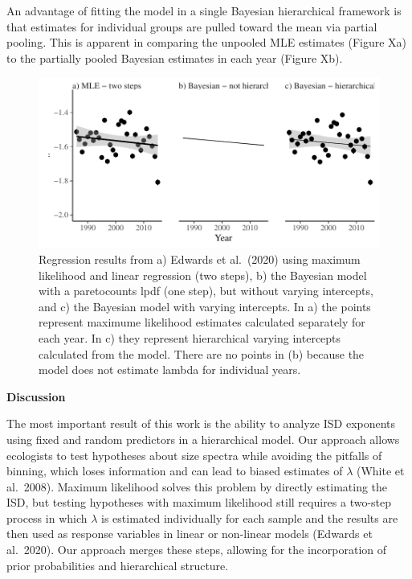\documentclass[
  12pt,
]{article}
\begin{document}
An advantage of fitting the model in a single Bayesian hierarchical
framework is that estimates for individual groups are pulled toward the
mean via partial pooling. This is apparent in comparing the unpooled MLE
estimates (Figure Xa) to the partially pooled Bayesian estimates in each
year (Figure Xb).

\begin{figure}
\centering
\includegraphics{stan_spectra_manuscript_update_files/figure-latex/unnamed-chunk-6-1.pdf}
\caption{Regression results from a) Edwards et al.~(2020) using maximum
likelihood and linear regression (two steps), b) the Bayesian model with
a paretocounts lpdf (one step), but without varying intercepts, and c)
the Bayesian model with varying intercepts. In a) the points represent
maximume likelihood estimates calculated separately for each year. In c)
they represent hierarchical varying intercepts calculated from the
model. There are no points in (b) because the model does not estimate
lambda for individual years.}
\end{figure}

\textbf{Discussion}

The most important result of this work is the ability to analyze ISD
exponents using fixed and random predictors in a hierarchical model. Our
approach allows ecologists to test hypotheses about size spectra while
avoiding the pitfalls of binning, which loses information and can lead
to biased estimates of \(\lambda\) (White et al.~2008). Maximum
likelihood solves this problem by directly estimating the ISD, but
testing hypotheses with maximum likelihood still requires a two-step
process in which \(\lambda\) is estimated individually for each sample
and the results are then used as response variables in linear or
non-linear models (Edwards et al.~2020). Our approach merges these
steps, allowing for the incorporation of prior probabilities and
hierarchical structure.
\end{document}
